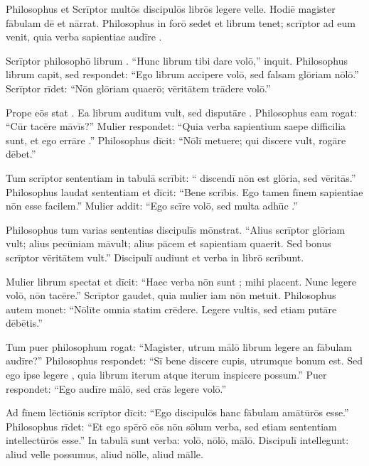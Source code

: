 \documentclass[12pt]{nextbook}
\begin{document}
\begin{readersection}{Philosophus et Scrīptor}
 multōs discipulōs librōs legere velle. Hodiē magister fābulam dē  et  nārrat. Philosophus in forō sedet et librum tenet; scrīptor ad eum venit, quia verba sapientiae audīre .

Scrīptor philosophō librum . “Hunc librum tibi dare volō,” inquit. Philosophus librum capit, sed respondet: “Ego librum accipere volō, sed falsam glōriam nōlō.” Scrīptor rīdet: “Nōn glōriam quaerō; vēritātem trādere volō.”

Prope eōs stat . Ea librum auditum vult, sed disputāre . Philosophus eam rogat: “Cūr tacēre māvīs?” Mulier respondet: “Quia verba sapientium saepe difficilia sunt, et ego errāre .” Philosophus dīcit: “Nōlī metuere; qui discere vult, rogāre dēbet.”

Tum scrīptor sententiam in tabulā scrībit: “ discendī nōn est glōria, sed vēritās.” Philosophus laudat sententiam et dīcit: “Bene scrībis. Ego tamen  fīnem sapientiae nōn esse facilem.” Mulier addit: “Ego scīre volō, sed multa adhūc .”

Philosophus tum varias sententias discipulīs mōnstrat. “Alius scrīptor glōriam vult; alius pecūniam māvult; alius pācem et sapientiam quaerit. Sed bonus scrīptor vēritātem  vult.” Discipulī audiunt et verba in librō scrībunt.

Mulier librum spectat et dīcit: “Haec verba nōn sunt ; mihi placent. Nunc legere volō, nōn tacēre.” Scrīptor gaudet, quia mulier iam nōn metuit. Philosophus autem monet: “Nōlīte omnia statim crēdere. Legere vultis, sed etiam putāre dēbētis.”

Tum puer philosophum rogat: “Magister, utrum mālō librum legere an fābulam audīre?” Philosophus respondet: “Sī bene discere cupis, utrumque bonum est. Sed ego ipse legere , quia librum iterum atque iterum inspicere possum.” Puer respondet: “Ego audīre mālō, sed crās legere volō.”

Ad fīnem lēctiōnis scrīptor dīcit: “Ego  discipulōs hanc fābulam amātūrōs esse.” Philosophus rīdet: “Et ego spērō eōs nōn sōlum verba, sed etiam sententiam intellectūrōs esse.” In tabulā sunt  verba: volō, nōlō, mālō. Discipulī intellegunt: aliud velle possumus, aliud nōlle, aliud mālle.

\end{readersection}
\end{document}
